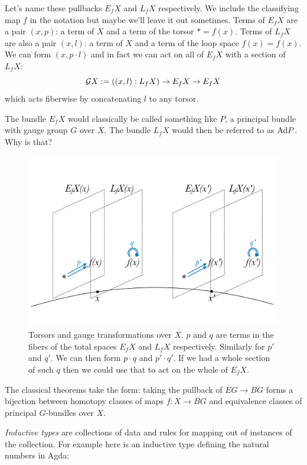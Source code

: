 \documentclass[14pt]{extarticle}
\begin{document}
Let's name these pullbacks $E_fX$ and $L_fX$ respectively. We include the classifying map $f$ in the notation but maybe we'll leave it out sometimes. Terms of $E_fX$ are a pair $(x, p)$: a term of $X$ and a term of the torsor $*=f(x)$. Terms of $L_fX$ are also a pair $(x, l)$: a term of $X$ and a term of the loop space $f(x)=f(x)$. We can form $(x, p\cdot l)$ and in fact we can act on all of $E_fX$ with a section of $L_fX$: $$\mathcal{G} X:=((x,l):L_fX)\to E_fX\to E_fX$$ which acts fiberwise by concatenating $l$ to any torsor.

The bundle $E_fX$ would classically be called something like $P$, a principal bundle with gauge group $G$ over $X$. The bundle $L_fX$ would then be referred to as $\mathrm{Ad} P$. Why is that? 

\begin{figure}[htb]
\begin{center}
\includegraphics[height=3in,width=4.5in]{torsors_and_gauge}
\caption{Torsors and gauge transformations over $X$. $p$ and $q$ are terms in the fibers of the total spaces $E_fX$ and $L_fX$ respectively. Similarly for $p'$ and $q'$. We can then form $p\cdot q$ and $p'\cdot q'$. If we had a whole section of such $q$ then we could use that to act on the whole of $E_fX$.}
\end{center}
\end{figure}

The classical theorems take the form: taking the pullback of $EG\to BG$ forms a bijection between homotopy classes of maps $f:X\to BG$ and equivalence classes of principal $G$-bundles over $X$. 

\emph{Inductive types} are collections of data and rules for mapping out of instances of the collection. For example here is an inductive type defining the natural numbers in Agda:
\begin{code}%
	\>[0]\AgdaSpace{}%
	\AgdaSpace{}%
	\AgdaSymbol{:}\AgdaSpace{}%
	\AgdaSpace{}%
	\<%
	\\
	\>[0][@{}l@{\AgdaIndent{0}}]%
	\>[2]\AgdaSpace{}%
	\AgdaSymbol{:}\AgdaSpace{}%
	\<%
	\\
	\>[2]\AgdaSpace{}%
	\AgdaSymbol{:}\AgdaSpace{}%
	\AgdaSpace{}%
	\AgdaSymbol{$\to$}\AgdaSpace{}%
	\<%
\end{code}
\end{document}
